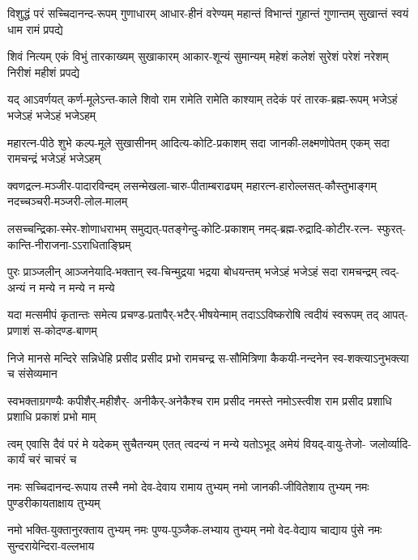 

\fourlineindentedshloka
{विशुद्धं परं सच्चिदानन्द-रूपम्}
{गुणाधारम् आधार-हीनं वरेण्यम्}
{महान्तं विभान्तं गुहान्तं गुणान्तम्}
{सुखान्तं स्वयं धाम रामं प्रपद्ये}%

\fourlineindentedshloka
{शिवं नित्यम् एकं विभुं तारकाख्यम्}
{सुखाकारम् आकार-शून्यं सुमान्यम्}
{महेशं कलेशं सुरेशं परेशं नरेशम्}
{निरीशं महीशं प्रपद्ये}%

\fourlineindentedshloka
{यद् आऽवर्णयत् कर्ण-मूलेऽन्त-काले}
{शिवो राम रामेति रामेति काश्याम्}
{तदेकं परं तारक-ब्रह्म-रूपम्}
{भजेऽहं भजेऽहं भजेऽहं भजेऽहम्}%

\fourlineindentedshloka
{महारत्न-पीठे शुभे कल्प-मूले}
{सुखासीनम् आदित्य-कोटि-प्रकाशम्}
{सदा जानकी-लक्ष्मणोपेतम् एकम्}
{सदा रामचन्द्रं भजेऽहं भजेऽहम्}%

\fourlineindentedshloka
{क्वणद्रत्न-मञ्जीर-पादारविन्दम्}
{लसन्मेखला-चारु-पीताम्बराढ्यम्}
{महारत्न-हारोल्लसत्-कौस्तुभाङ्गम्}
{नदच्चञ्चरी-मञ्जरी-लोल-मालम्}%

\fourlineindentedshloka
{लसच्चन्द्रिका-स्मेर-शोणाधराभम्}
{समुद्यत्-पतङ्गेन्दु-कोटि-प्रकाशम्}
{नमद्-ब्रह्म-रुद्रादि-कोटीर-रत्न-}
{स्फुरत्-कान्ति-नीराजना-ऽऽराधिताङ्घ्रिम्}%

\fourlineindentedshloka
{पुरः प्राञ्जलीन् आञ्जनेयादि-भक्तान्}
{स्व-चिन्मुद्रया भद्रया बोधयन्तम्}
{भजेऽहं भजेऽहं सदा रामचन्द्रम्}
{त्वद्-अन्यं न मन्ये न मन्ये न मन्ये}%

\fourlineindentedshloka
{यदा मत्समीपं कृतान्तः समेत्य}
{प्रचण्ड-प्रतापैर्-भटैर्-भीषयेन्माम्}
{तदाऽऽविष्करोषि त्वदीयं स्वरूपम्}
{तद् आपत्-प्रणाशं स-कोदण्ड-बाणम्}%

\fourlineindentedshloka
{निजे मानसे मन्दिरे सन्निधेहि}
{प्रसीद प्रसीद प्रभो रामचन्द्र}
{स-सौमित्रिणा कैकयी-नन्दनेन}
{स्व-शक्त्याऽनुभक्त्या च संसेव्यमान}%

\fourlineindentedshloka
{स्वभक्ताग्रगण्यैः कपीशैर्-महीशैर्-}
{अनीकैर्-अनेकैश्च राम प्रसीद}
{नमस्ते नमोऽस्त्वीश राम प्रसीद}
{प्रशाधि प्रशाधि प्रकाशं प्रभो माम्}%

\fourlineindentedshloka
{त्वम् एवासि दैवं परं मे यदेकम्}
{सुचैतन्यम् एतत् त्वदन्यं न मन्ये}
{यतोऽभूद् अमेयं वियद्-वायु-तेजो-}
{जलोर्व्यादि-कार्यं चरं चाचरं च}%

\fourlineindentedshloka
{नमः सच्चिदानन्द-रूपाय तस्मै}
{नमो देव-देवाय रामाय तुभ्यम्}
{नमो जानकी-जीवितेशाय तुभ्यम्}
{नमः पुण्डरीकायताक्षाय तुभ्यम्}%

\fourlineindentedshloka
{नमो भक्ति-युक्तानुरक्ताय तुभ्यम्}
{नमः पुण्य-पुञ्जैक-लभ्याय तुभ्यम्}
{नमो वेद-वेद्याय चाद्याय पुंसे}
{नमः सुन्दरायेन्दिरा-वल्लभाय}%

